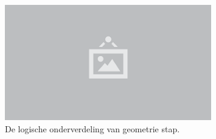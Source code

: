 \begin{figure}
  \centering
  \includegraphics[width=0.8\textwidth]{./img/raw/placeholder.png}
  \caption{De logische onderverdeling van geometrie stap.}
  \label{fig:mgp-geometrie}
\end{figure}

